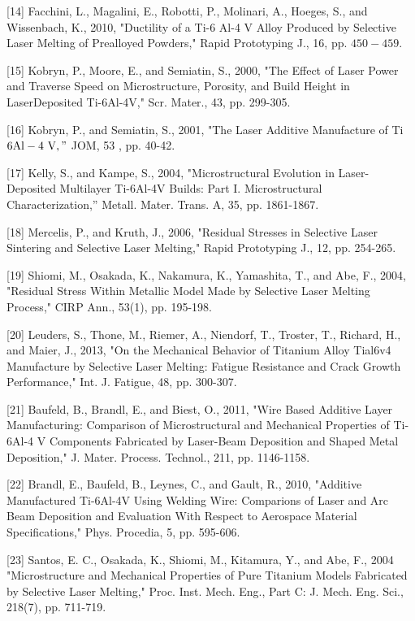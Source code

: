 \documentclass[10pt]{article}
\begin{document}
[14] Facchini, L., Magalini, E., Robotti, P., Molinari, A., Hoeges, S., and Wissenbach, K., 2010, "Ductility of a Ti-6 Al-4 V Alloy Produced by Selective Laser Melting of Prealloyed Powders," Rapid Prototyping J., 16, pp. $450-459$.

[15] Kobryn, P., Moore, E., and Semiatin, S., 2000, "The Effect of Laser Power and Traverse Speed on Microstructure, Porosity, and Build Height in LaserDeposited Ti-6Al-4V," Scr. Mater., 43, pp. 299-305.

[16] Kobryn, P., and Semiatin, S., 2001, "The Laser Additive Manufacture of Ti$6 \mathrm{Al}-4 \mathrm{~V}, "$ JOM, 53 , pp. 40-42.

[17] Kelly, S., and Kampe, S., 2004, "Microstructural Evolution in Laser-Deposited Multilayer Ti-6Al-4V Builds: Part I. Microstructural Characterization,” Metall. Mater. Trans. A, 35, pp. 1861-1867.

[18] Mercelis, P., and Kruth, J., 2006, "Residual Stresses in Selective Laser Sintering and Selective Laser Melting," Rapid Prototyping J., 12, pp. 254-265.

[19] Shiomi, M., Osakada, K., Nakamura, K., Yamashita, T., and Abe, F., 2004, "Residual Stress Within Metallic Model Made by Selective Laser Melting Process," CIRP Ann., 53(1), pp. 195-198.

[20] Leuders, S., Thone, M., Riemer, A., Niendorf, T., Troster, T., Richard, H., and Maier, J., 2013, "On the Mechanical Behavior of Titanium Alloy Tial6v4 Manufacture by Selective Laser Melting: Fatigue Resistance and Crack Growth Performance," Int. J. Fatigue, 48, pp. 300-307.

[21] Baufeld, B., Brandl, E., and Biest, O., 2011, "Wire Based Additive Layer Manufacturing: Comparison of Microstructural and Mechanical Properties of Ti-6Al-4 V Components Fabricated by Laser-Beam Deposition and Shaped Metal Deposition," J. Mater. Process. Technol., 211, pp. 1146-1158.

[22] Brandl, E., Baufeld, B., Leynes, C., and Gault, R., 2010, "Additive Manufactured Ti-6Al-4V Using Welding Wire: Comparions of Laser and Arc Beam Deposition and Evaluation With Respect to Aerospace Material Specifications," Phys. Procedia, 5, pp. 595-606.

[23] Santos, E. C., Osakada, K., Shiomi, M., Kitamura, Y., and Abe, F., 2004 "Microstructure and Mechanical Properties of Pure Titanium Models Fabricated by Selective Laser Melting," Proc. Inst. Mech. Eng., Part C: J. Mech. Eng. Sci., 218(7), pp. 711-719.
\end{document}
